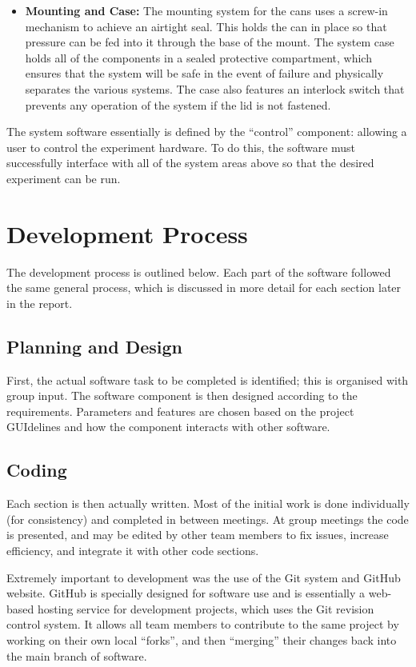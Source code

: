 \begin{itemize}
	\item {\bf Mounting and Case:} The mounting system for the cans uses a screw-in mechanism to achieve an airtight seal. This holds the can in place so that pressure can be fed into it through the base of the mount. The system case holds all of the components in a sealed protective compartment, which ensures that the system will be safe in the event of failure and physically separates the various systems. The case also features an interlock switch that prevents any operation of the system if the lid is not fastened.

\end{itemize}

The system software essentially is defined by the ``control'' component: allowing a user to control the experiment hardware. To do this, the software must successfully interface with all of the system areas above so that the desired experiment can be run. 

\section{Development Process}

The development process is outlined below. Each part of the software followed the same general process, which is discussed in more detail for each section later in the report.

\subsection{Planning and Design}
First, the actual software task to be completed is identified; this is organised with group input. The software component is then designed according to the requirements. Parameters and features are chosen based on the project GUIdelines and how the component interacts with other software. 

\subsection{Coding}

Each section is then actually written. Most of the initial work is done individually (for consistency) and completed in between meetings. At group meetings the code is presented, and may be edited by other team members to fix issues, increase efficiency, and integrate it with other code sections.


Extremely important to development was the use of the Git system\cite{github,gitucc} and GitHub website\cite{github}. GitHub is specially designed for software use and is essentially a web-based hosting service for development projects, which uses the Git revision control system. It allows all team members to contribute to the same project by working on their own local ``forks'', and then ``merging'' their changes back into the main branch of software\cite{github_fork}.

